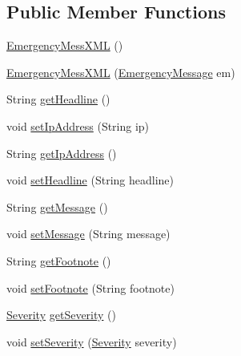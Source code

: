 \subsection*{Public Member Functions}
\begin{DoxyCompactItemize}
\item 
\hyperlink{classgov_1_1fnal_1_1ppd_1_1dd_1_1xml_1_1EmergencyMessXML_a9f89156f6ccc77d09db3239525e969eb}{Emergency\-Mess\-X\-M\-L} ()
\item 
\hyperlink{classgov_1_1fnal_1_1ppd_1_1dd_1_1xml_1_1EmergencyMessXML_af168ab318ac6a8f3ae56f90fa37ddb43}{Emergency\-Mess\-X\-M\-L} (\hyperlink{classgov_1_1fnal_1_1ppd_1_1dd_1_1emergency_1_1EmergencyMessage}{Emergency\-Message} em)
\item 
String \hyperlink{classgov_1_1fnal_1_1ppd_1_1dd_1_1xml_1_1EmergencyMessXML_a345b7a93f7061f91319b2b15c6b54d28}{get\-Headline} ()
\item 
void \hyperlink{classgov_1_1fnal_1_1ppd_1_1dd_1_1xml_1_1EmergencyMessXML_a812634cc4c8054f0f5ec1362f4cb753d}{set\-Ip\-Address} (String ip)
\item 
String \hyperlink{classgov_1_1fnal_1_1ppd_1_1dd_1_1xml_1_1EmergencyMessXML_a08a77f7d85f5e8dc4866536b36bc3929}{get\-Ip\-Address} ()
\item 
void \hyperlink{classgov_1_1fnal_1_1ppd_1_1dd_1_1xml_1_1EmergencyMessXML_a8f2fb8bdd96c7d92024e1a22648ad12d}{set\-Headline} (String headline)
\item 
String \hyperlink{classgov_1_1fnal_1_1ppd_1_1dd_1_1xml_1_1EmergencyMessXML_a1b5accf95bbf51b2c7593c5c4059281d}{get\-Message} ()
\item 
void \hyperlink{classgov_1_1fnal_1_1ppd_1_1dd_1_1xml_1_1EmergencyMessXML_a9875a3ef60e1cab734a4e3228577233e}{set\-Message} (String message)
\item 
String \hyperlink{classgov_1_1fnal_1_1ppd_1_1dd_1_1xml_1_1EmergencyMessXML_a8c758c30d72d07f73ae68954d39ed15a}{get\-Footnote} ()
\item 
void \hyperlink{classgov_1_1fnal_1_1ppd_1_1dd_1_1xml_1_1EmergencyMessXML_a580bffe41322beb82d8ed2ceddee38d2}{set\-Footnote} (String footnote)
\item 
\hyperlink{enumgov_1_1fnal_1_1ppd_1_1dd_1_1emergency_1_1Severity}{Severity} \hyperlink{classgov_1_1fnal_1_1ppd_1_1dd_1_1xml_1_1EmergencyMessXML_add95f1e21cc3cebba7fdc75542cc1f35}{get\-Severity} ()
\item 
void \hyperlink{classgov_1_1fnal_1_1ppd_1_1dd_1_1xml_1_1EmergencyMessXML_a17ea3c94965d69d10a6cdcc56fd42292}{set\-Severity} (\hyperlink{enumgov_1_1fnal_1_1ppd_1_1dd_1_1emergency_1_1Severity}{Severity} severity)

\end{DoxyCompactItemize}
